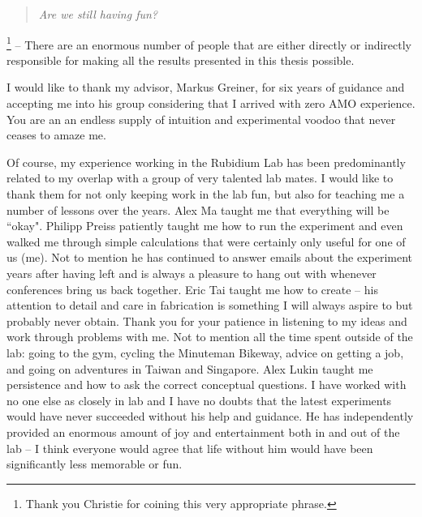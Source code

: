 
\begin{minipage}[t]{75mm}
 \begin{quotation}
 \emph{Are we still having fun?}
 \end{quotation}
 \end{minipage}
 
 \vspace{10mm}

\footnote{Thank you Christie for coining this very appropriate phrase.} -- There are an enormous number of people that are either directly or indirectly responsible for making all the results presented in this thesis possible.

I would like to thank my advisor, Markus Greiner, for six years of guidance and accepting me into his group considering that I arrived with zero AMO experience. You are an an endless supply of intuition and experimental voodoo that never ceases to amaze me.

Of course, my experience working in the Rubidium Lab has been predominantly related to my overlap with a group of very talented lab mates. I would like to thank them for not only keeping work in the lab fun, but also for teaching me a number of lessons over the years. Alex Ma taught me that everything will be ``okay". Philipp Preiss patiently taught me how to run the experiment and even walked me through simple calculations that were certainly only useful for one of us (me). Not to mention he has continued to answer emails about the experiment years after having left and is always a pleasure to hang out with whenever conferences bring us back together. Eric Tai taught me how to create -- his attention to detail and care in fabrication is something I will always aspire to but probably never obtain. Thank you for your patience in listening to my ideas and work through problems with me. Not to mention all the time spent outside of the lab: going to the gym, cycling the Minuteman Bikeway, advice on getting a job, and going on adventures in Taiwan and Singapore. Alex Lukin taught me persistence and how to ask the correct conceptual questions. I have worked with no one else as closely in lab and I have no doubts that the latest experiments would have never succeeded without his help and guidance. He has independently provided an enormous amount of joy and entertainment both in and out of the lab -- I think everyone would agree that life without him would have been significantly less memorable or fun.

